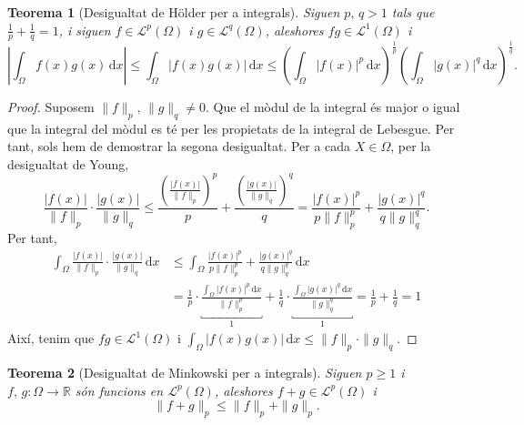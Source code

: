 \documentclass[12pt]{book}
\newtheorem{teorema}{Teorema}[chapter]
\theoremstyle{definition}
\theoremstyle{nota}
\theoremstyle{exemple}
\begin{document}
\begin{teorema}[Desigualtat de Hölder per a integrals]
  Siguen $p,\,q>1$ tals que $\frac{1}{p} + \frac{1}{q} = 1$, i siguen
  $f \in \mathcal{L}^p(\Omega)$ i $g \in \mathcal{L}^q(\Omega)$,
  aleshores $fg \in \mathcal{L}^1(\Omega)$ i
  \[
    \left| \int_\Omega f(x)g(x)\, \mathrm{d}x \right| \leq
    \int_\Omega |f(x)g(x)|\,\mathrm{d}x \leq
    \left(\int_\Omega |f(x)|^p\,\mathrm{d}x\right)^{\frac{1}{p}}
    \left(\int_\Omega |g(x)|^q\,\mathrm{d}x\right)^{\frac{1}{q}}.
  \]
\end{teorema}

\begin{proof}
  Suposem $\|f\|_p, \, \|g\|_q \neq 0$. Que el mòdul de la integral és
  major o igual que la integral del mòdul es té per les propietats de
  la integral de Lebesgue. Per tant, sols hem de demostrar la segona
  desigualtat. Per a cada $X \in \Omega$, per la desigualtat de Young,
  \[
    \frac{|f(x)|}{\|f\|_p} \cdot \frac{|g(x)|}{\|g\|_q} \leq
    \frac{\left( \frac{|f(x)|}{\|f\|_p} \right)^p}{p} +
    \frac{\left( \frac{|g(x)|}{\|g\|_q} \right)^q}{q} =
    \frac{|f(x)|^p}{p\|f\|_p^p} + \frac{|g(x)|^q}{q\|g\|_q^q}.
  \]
  Per tant,
  \begin{align*}
    \int_\Omega \frac{|f(x)|}{\|f\|_p} \cdot \frac{|g(x)|}{\|g\|_q}
    \,\mathrm{d}x
    &\leq \int_\Omega \frac{|f(x)|^p}{p\|f\|_p^p} +
      \frac{|g(x)|^q}{q\|g\|_q^q} \,\mathrm{d}x \\
    &=\frac{1}{p} \cdot
      \underbracket{\frac{\int_\Omega|f(x)|^p\,\mathrm{d}x}{\|f\|_p^p}}_1 +
      \frac{1}{q} \cdot
      \underbracket{\frac{\int_\Omega|g(x)|^q\,\mathrm{d}x}{\|g\|_q^q}}_1
      = \frac{1}{p} + \frac{1}{q} = 1
  \end{align*}
  Així, tenim que $fg \in \mathcal{L}^1(\Omega)$ i 
  \(
    \int_\Omega |f(x)g(x)| \, \mathrm{d}x \leq \|f\|_p \cdot \|g\|_q.
  \)
\end{proof}

\begin{teorema}[Desigualtat de Minkowski per a integrals]
  Siguen $p \geq 1$ i $f,\,g : \Omega \to \mathbb{R}$ són funcions en
  $\mathcal{L}^p(\Omega)$, aleshores $f+g \in \mathcal{L}^p(\Omega)$ i
  \[
    \|f + g\|_p \leq \|f\|_p + \|g\|_p.
  \]
\end{teorema}
\end{document}
